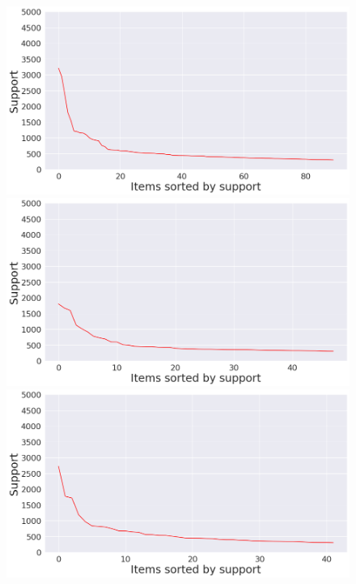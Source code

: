 \documentclass[12pt,%
               a4paper,%
               oneside,openany,%
               titlepage,%
               headinclude,footinclude,%
               BCOR5mm,%
               cleardoublepage=empty,%
               tablecaptionabove,%
               floatperchapter,
               ]{scrreprt}                 %
\begin{document}
\begin{figure}[ht]
   \begin{minipage}[b]{0.5\linewidth}
   \centering
    \includegraphics[width=.9\linewidth]{Figures/Support_distrubution_Rareearth.png}
    \vspace{4ex}
  \end{minipage}
  \begin{minipage}[b]{0.5\linewidth}
    \centering
    \includegraphics[width=.9\linewidth]{Figures/Support_distrubution_Afghanistan.png}
    \vspace{4ex}
  \end{minipage}
  \begin{minipage}[b]{0.5\linewidth}
    \centering
    \includegraphics[width=.9\linewidth]{Figures/Support_distrubution_delta.png}

\end{minipage}
\end{figure}
\end{document}
